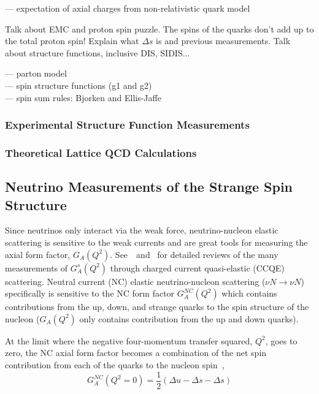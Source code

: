   --- expectation of axial charges from non-relativistic quark model

  Talk about EMC and proton spin puzzle. The spins of the quarks don't add up
  to the total proton spin! Explain what $\Delta s$ is and previous
  measurements. Talk about structure functions, inclusive DIS, SIDIS...

  --- parton model \\
  --- spin structure functions (g1 and g2) \\
  --- spin sum rules: Bjorken and Ellis-Jaffe \\

  \subsubsection{Experimental Structure Function Measurements}

  \subsubsection{Theoretical Lattice QCD Calculations}



  \subsection{Neutrino Measurements of the Strange Spin Structure}
  \label{sec:neutrinos}
    Since neutrinos only interact via the weak force, neutrino-nucleon elastic
    scattering is sensitive to the weak currents and are great tools for
    measuring the axial form factor, $G_A(Q^2)$.
    See~\cite{Lyubushkin:2008pe}~and~\cite{Formaggio:2013kya} for detailed
    reviews of the many measurements of $G_A^s(Q^2)$ through charged current
    quasi-elastic (CCQE) scattering. Neutral current (NC) elastic
    neutrino-nucleon scattering ($\nu N \rightarrow \nu N$) specifically is
    sensitive to the NC form factor $G_A^{NC}(Q^2)$ which contains
    contributions from the up, down, and strange quarks to the spin structure
    of the nucleon ($G_A(Q^2)$ only contains contribution from the up and down
    quarks).

    At the limit where the negative four-momentum transfer squared, $Q^2$, goes
    to zero, the NC axial form factor becomes a combination of the net spin
    contribution from each of the quarks to the nucleon spin~\cite{Bass:2007zzb},
    \begin{equation*}
      G_A^{NC}(Q^2 = 0) = \frac{1}{2}(\Delta u - \Delta s - \Delta s)
    \end{equation*}

